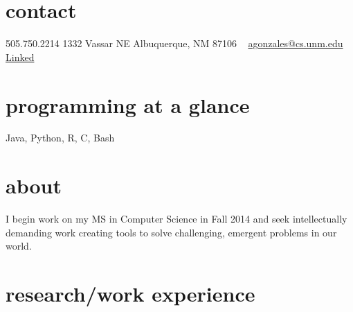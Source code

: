 \documentclass[]{friggeri-cv} %
\begin{document}


\begin{aside} %
\section{contact}
505.750.2214 
1332 Vassar NE
Albuquerque, NM 87106
~
\href{mailto:agonzales@cs.unm.edu}{agonzales@cs.unm.edu}
~
\href{http://lnkd.in/b8kfQSe}{Linked\scriptsize{\faLinkedin}}
\section{programming at a glance}
Java, Python, R, C, Bash
~
\section{about}
I begin work on my MS in Computer Science in Fall 2014 and seek intellectually demanding work creating tools to solve challenging, emergent problems in our world.
\end{aside}




\section{research/work experience}
\end{document}
